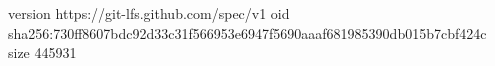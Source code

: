 version https://git-lfs.github.com/spec/v1
oid sha256:730ff8607bdc92d33c31f566953e6947f5690aaaf681985390db015b7cbf424c
size 445931
